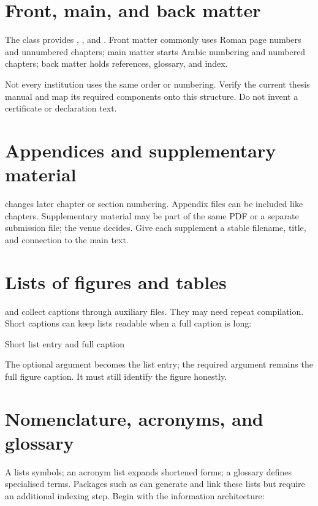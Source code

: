 \section{Front, main, and back matter}

The  class provides , , and
. Front matter commonly uses Roman page numbers and unnumbered
chapters; main matter starts Arabic numbering and numbered chapters; back
matter holds references, glossary, and index.

Not every institution uses the same order or numbering. Verify the current
thesis manual and map its required components onto this structure. Do not
invent a certificate or declaration text.

\section{Appendices and supplementary material}

 changes later chapter or section numbering. Appendix files can
be included like chapters. Supplementary material may be part of the same PDF
or a separate submission file; the venue decides. Give each supplement a
stable filename, title, and connection to the main text.

\section{Lists of figures and tables}

 and  collect captions through auxiliary
files. They may need repeat compilation. Short captions can keep lists readable
when a full caption is long:

\begin{latexcode}{Short list entry and full caption}
\caption[Simulated method comparison]{Relationship between Method A
and Method B for all simulated paired values. The dashed line marks
equality.}
\end{latexcode}

The optional argument becomes the list entry; the required argument remains the
full figure caption. It must still identify the figure honestly.

\section{Nomenclature, acronyms, and glossary}

A  lists symbols; an acronym list expands shortened forms;
a glossary defines specialised terms. Packages such as  can
generate and link these lists but require an additional indexing step. Begin
with the information architecture:

